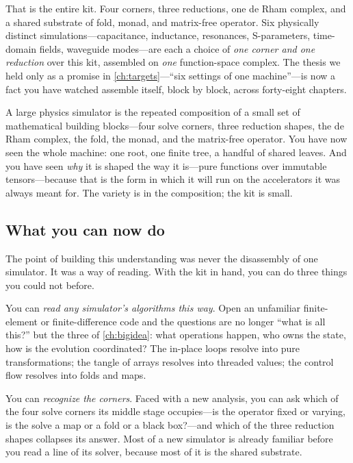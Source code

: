 That is the entire kit. Four corners, three reductions, one de Rham complex, and a
shared substrate of fold, monad, and matrix-free operator. Six physically distinct
simulations---capacitance, inductance, resonances, S-parameters, time-domain fields,
waveguide modes---are each a choice of \emph{one corner and one reduction} over this
kit, assembled on \emph{one} function-space complex. The thesis we held only as a
promise in \cref{ch:targets}---``six settings of one machine''---is now a fact you have
watched assemble itself, block by block, across forty-eight chapters.

\begin{keyidea}
A large physics simulator is the repeated composition of a small set of mathematical
building blocks---four solve corners, three reduction shapes, the de Rham complex, the
fold, the monad, and the matrix-free operator. You have now seen the whole machine: one
root, one finite tree, a handful of shared leaves. And you have seen \emph{why} it is
shaped the way it is---pure functions over immutable tensors---because that is the form
in which it will run on the accelerators it was always meant for. The variety is in the
composition; the kit is small.
\end{keyidea}

\subsection{What you can now do}
\label{sec:wm-cando}

The point of building this understanding was never the disassembly of one simulator. It
was a way of reading. With the kit in hand, you can do three things you could not before.

You can \emph{read any simulator's algorithms this way}. Open an unfamiliar
finite-element or finite-difference code and the questions are no longer ``what is all
this?'' but the three of \cref{ch:bigidea}: what operations happen, who owns the state,
how is the evolution coordinated? The in-place loops resolve into pure transformations;
the tangle of arrays resolves into threaded values; the control flow resolves into folds
and maps.

You can \emph{recognize the corners}. Faced with a new analysis, you can ask which of
the four solve corners its middle stage occupies---is the operator fixed or varying, is
the solve a map or a fold or a black box?---and which of the three reduction shapes
collapses its answer. Most of a new simulator is already familiar before you read a line
of its solver, because most of it is the shared substrate.

